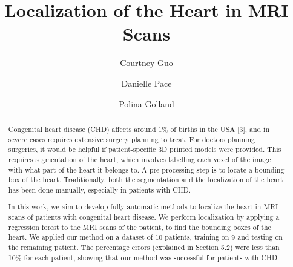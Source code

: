 \documentclass[sigconf,11pt]{acmart}
\begin{document}
\title{Localization of the Heart in MRI Scans}

\author{Courtney Guo}

\author{Danielle Pace}

\author{Polina Golland}

\begin{abstract}
Congenital heart disease (CHD) affects around 1\% of births in the USA [3], and in severe cases requires extensive surgery planning to treat. For doctors planning surgeries, it would be helpful if patient-specific 3D printed models were provided. This requires segmentation of the heart, which involves labelling each voxel of the image with what part of the heart it belongs to. A pre-processing step is to locate a bounding box of the heart. Traditionally, both the segmentation and the localization of the heart has been done manually, especially in patients with CHD.

In this work, we aim to develop fully automatic methods to localize the heart in MRI scans of patients with congenital heart disease. We perform localization by applying a regression forest to the MRI scans of the patient, to find the bounding boxes of the heart. We applied our method on a dataset of 10 patients, training on 9 and testing on the remaining patient. The percentage errors (explained in Section 5.2) were less than 10\% for each patient, showing that our method was successful for patients with CHD.
\end{abstract}

\maketitle






\end{document}
